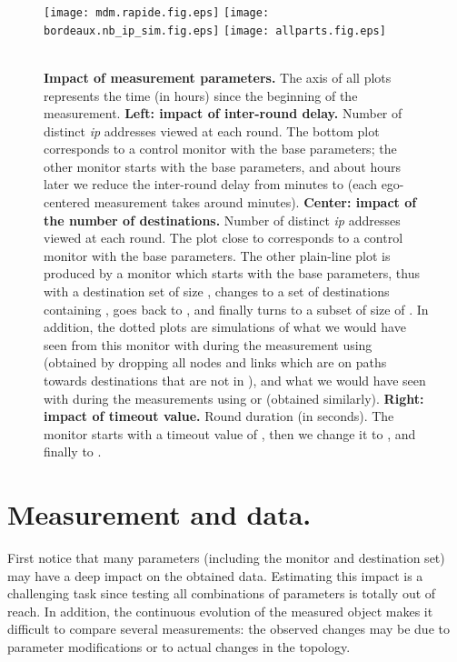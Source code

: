 \documentclass[times, 10pt,twocolumn]{article}
\newcommand{\myscale}{0.48}
\newcommand{\axes}[3]{\mbox{ }\hfill \scalebox{0.7}{\em #1} 
  \hfill \mbox{ } \hfill \scalebox{0.7}{\em #2} 
  \hfill \mbox{ } \hfill \scalebox{0.7}{\em #3} \hfill \mbox{ } \vskip -0.2cm}
\newcommand{\ip}{\mbox{\em \sc ip}}
\begin{document}
\begin{figure*}[!ht]
\centering
\texttt{[image: mdm.rapide.fig.eps]}
\texttt{[image: bordeaux.nb\_ip\_sim.fig.eps]}
\texttt{[image: allparts.fig.eps]}\\
\axes{\ \ \ \ \ \ \ \ \ \ \  \hspace{1cm} = hours;  = \# ip}{\ \ \ \ \ \ \ \ \hspace{2.5cm} \em  = hours;  = \# ip}{\ \ \ \hspace{2cm}  = hours;  = round duration (s)}
\caption{
{\bf Impact of measurement parameters.} 
The  axis of all plots represents the time (in hours) since the beginning of the measurement.
{\bf Left: impact of inter-round delay.} Number of distinct \ip{} addresses viewed at each round. The bottom plot corresponds to a control monitor with the base parameters; the other monitor starts with the base parameters, and about  hours later we reduce the inter-round delay from  minutes to  (each ego-centered measurement takes around  minutes).
{\bf Center: impact of the number of destinations.} Number of distinct \ip{} addresses viewed at each round.
The plot close to  corresponds to a control monitor with the base parameters. The other plain-line plot is produced by a monitor which starts with the base parameters, thus with a destination set  of size , changes to a set  of  destinations containing , 
goes back to ,
and finally turns to a subset  of size  of .
In addition, the dotted plots are simulations of what we would have seen from this monitor with  during the measurement using  (obtained by dropping all nodes and links which are on paths towards destinations that are not in ), and what we would have seen with  during the measurements using  or  (obtained similarly).
{\bf Right: impact of timeout value.} Round duration (in seconds). 
The monitor starts with a timeout value of , then we change it to , and finally to .
}
\label{fig_speed_up}
\label{fig_nb_dest}
\end{figure*}

\section{Measurement and data.}
\label{sec_data}



First notice that many parameters (including the monitor and destination set) may have a deep impact on the obtained data. Estimating this impact is a challenging task since testing all combinations of parameters is totally out of reach. In addition, the continuous evolution of the measured object makes it difficult to compare several measurements: the observed changes may be due to parameter modifications or to actual changes in the topology.
\end{document}
